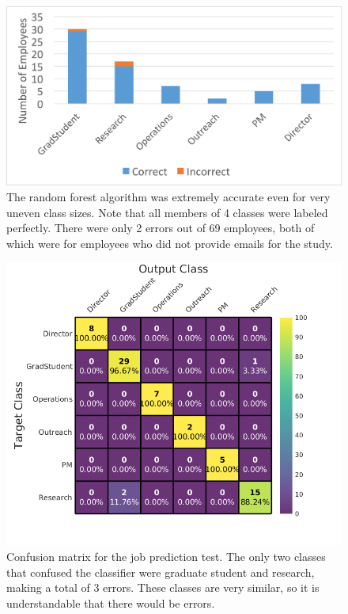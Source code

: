 \documentclass[12pt]{report}
\begin{document}
\begin{figure}[t]
    \centering
    \includegraphics[width=\columnwidth,trim={0mm 0mm 0mm 0mm},clip]{Prediction_50_50_RF}
    \vspace{-20pt}
    \caption[Job title classification results]{The random forest algorithm was extremely accurate even for very uneven class sizes.  Note that all members of 4 classes were labeled perfectly.  There were only 2 errors out of 69 employees, both of which were for employees who did not provide emails for the study.}
    \label{fig:result_hist}
\end{figure}


\begin{figure}[t]
    \centering
        \includegraphics[width=.7\columnwidth,trim={0mm 0mm 0mm 0mm},clip]{Classification_confusion}
        \vspace{-7pt}
        \caption[Job title prediction confusion matrix]{Confusion matrix for the job prediction test.  The only two classes that confused the classifier were graduate student and research, making a total of 3 errors.  These classes are very similar, so it is understandable that there would be errors.}
        \label{fig:conf_matrix}
\end{figure}
\end{document}
